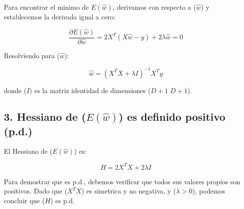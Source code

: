 \documentclass{article}
\begin{document}
Para encontrar el minimo de \(E(\hat{w})\), derivamos con respecto a (\(\hat{w}\)) y establecemos la derivada igual a cero:

\[ \frac{\partial E(\hat{w})}{\partial \hat{w}} = 2X^T(X\hat{w} - y) + 2\lambda \hat{w} = 0 \]

Resolviendo para (\(\hat{w}\)):

\[ \hat{w} = (X^T X + \lambda I)^{-1} X^T y \]

donde (\(I\)) es la matriz identidad de dimensiones (\(D + 1\) \times \(D + 1\)).

\subsection*{3. Hessiano de (\(E(\hat{w})\)) es definido positivo (p.d.)}

El Hessiano de (\(E(\hat{w})\)) es:

\[ H = 2X^T X + 2\lambda I \]

Para demostrar que es p.d., debemos verificar que todos sus valores propios son positivos. Dado que (\(X^T X\)) es simetrica y no negativa, y (\(\lambda > 0\)), podemos concluir que (\(H\)) es p.d.
\end{document}
